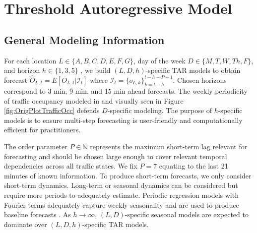 \section{Threshold Autoregressive Model}
\label{sec:trafficmodels}

\subsection{General Modeling Information}
For each location $L\in \{A,B,C,D,E,F,G\}$, day of the week $D\in\{M,T,W,Th,F\}$, and horizon $h \in \{1,3,5\}$ , we build $(L,D,h)$-specific TAR models to obtain forecast $\widehat{O}_{L,t}=E[O_{L,t}|\mathcal{I}_t]$ where $\mathcal{I}_t=\{o_{L,k}\}_{k=t-h}^{t-h-P+1}$. Chosen horizons correspond to 3 min, 9 min, and 15 min ahead forecasts. The weekly periodicity of traffic occupancy modeled in \cite{Williams1999,Ghosh2007,Kamarianakis2010} and visually seen in Figure \ref{fig:OrigPlotTrafficOcc} defends $D$-specific modeling. The purpose of $h$-specific models is to ensure multi-step forecasting is user-friendly and computationally efficient for practitioners. 

The order parameter $P\in\mathbb{N}$ represents the maximum short-term lag relevant for forecasting and should be chosen large enough to cover relevant temporal dependencies across all traffic states. We fix $P=7$ equating to the last 21 minutes of known information. To produce short-term forecasts, we only consider short-term dynamics. Long-term or seasonal dynamics can be considered but require more periods to adequately estimate. Periodic regression models with Fourier terms adequately capture weekly seasonality and are used to produce baseline forecasts \citep{Kamarianakis2010}. As $h\to\infty$, $(L,D)$-specific seasonal models are expected to dominate over $(L,D,h)$-specific TAR models.
 
